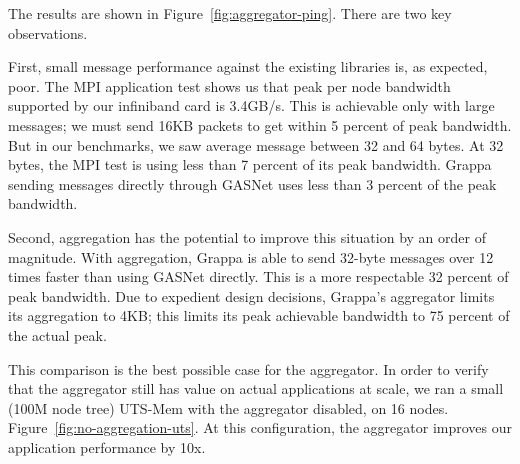 The results are shown in Figure~\ref{fig:aggregator-ping}. There are
two key observations.

First, small message performance against the existing libraries is, as expected, poor. The MPI application test shows us that peak per node
bandwidth supported by our infiniband card is 3.4GB/s. This is
achievable only with large messages; we must send 16KB packets to get
within 5 percent of peak bandwidth. But in our benchmarks, we saw
average message between 32 and 64 bytes. At 32 bytes, the MPI test is
using less than 7 percent of its peak bandwidth. Grappa sending
messages directly through GASNet uses less than 3 percent of the peak
bandwidth.

Second, aggregation has the potential to improve this situation by an
order of magnitude. With aggregation, Grappa is able to send 32-byte
messages over 12 times faster than using GASNet directly. This is a
more respectable 32 percent of peak bandwidth. Due to expedient design
decisions, Grappa's aggregator limits its aggregation to 4KB; this
limits its peak achievable bandwidth to 75 percent of the actual
peak.

This comparison is the best possible case for the aggregator. In
order to verify that the aggregator still has value on actual
applications at scale, we ran a small (100M node tree) UTS-Mem
with the aggregator disabled, on 16 nodes.
Figure~\ref{fig:no-aggregation-uts}. At this configuration, the aggregator
improves our application performance by 10x. 

